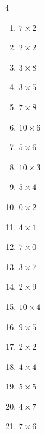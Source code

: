 \begin{multicols}{4}
\begin{enumerate}
  \item $7\times 2$
        \phantom{$=14$}

  \item $2\times 2$
        \phantom{$=4$}

  \item $3\times 8$
        \phantom{$=24$}

  \item $3\times 5$
        \phantom{$=15$}

  \item $7\times 8$
        \phantom{$=56$}

  \item $10\times 6$
        \phantom{$=60$}

  \item $5\times 6$
        \phantom{$=30$}

  \item $10\times 3$
        \phantom{$=30$}

  \item $5\times 4$
        \phantom{$=20$}

  \item $0\times 2$
        \phantom{$=0$}

  \item $4\times 1$
        \phantom{$=4$}

  \item $7\times 0$
        \phantom{$=0$}

  \item $3\times 7$
        \phantom{$=21$}

  \item $2\times 9$
        \phantom{$=18$}

  \item $10\times 4$
        \phantom{$=40$}

  \item $9\times 5$
        \phantom{$=45$}

  \item $2\times 2$
        \phantom{$=4$}

  \item $4\times 4$
        \phantom{$=16$}

  \item $5\times 5$
        \phantom{$=25$}

  \item $4\times 7$
        \phantom{$=28$}

  \item $7\times 6$
        \phantom{$=42$}


\end{enumerate}
\end{multicols}
